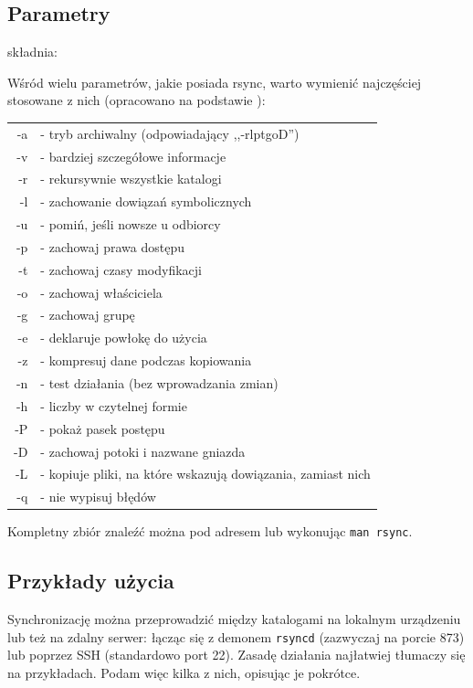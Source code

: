 \subsection{Parametry}
składnia: 

Wśród wielu parametrów, jakie posiada rsync, warto wymienić najczęściej stosowane z nich (opracowano na podstawie \cite{6}):
\begin{center}
\begin{tabular}{ r l }
-a & - tryb archiwalny (odpowiadający ,,-rlptgoD'') \\
-v & - bardziej szczegółowe informacje \\
-r & - rekursywnie wszystkie katalogi \\ 
-l & - zachowanie dowiązań symbolicznych \\
-u & - pomiń, jeśli nowsze u odbiorcy \\
-p & - zachowaj prawa dostępu \\
-t & - zachowaj czasy modyfikacji \\
-o & - zachowaj właściciela \\
-g & - zachowaj grupę \\
-e & - deklaruje powłokę do użycia \\
-z & - kompresuj dane podczas kopiowania \\
-n & - test działania (bez wprowadzania zmian) \\
-h & - liczby w czytelnej formie \\
-P & - pokaż pasek postępu \\
-D & - zachowaj potoki i nazwane gniazda\\
-L & - kopiuje pliki, na które wskazują dowiązania, zamiast nich \\
-q & - nie wypisuj błędów
\end{tabular}
\end{center}
Kompletny zbiór znaleźć można pod adresem \cite{6} lub wykonując \verb|man rsync|.

\subsection{Przykłady użycia}
Synchronizację można przeprowadzić między katalogami na lokalnym urządzeniu lub też na zdalny serwer: łącząc się z demonem \verb|rsyncd| (zazwyczaj na porcie 873) lub poprzez SSH (standardowo port 22).
Zasadę działania najłatwiej tłumaczy się na przykładach. Podam więc kilka z nich, opisując je pokrótce.

